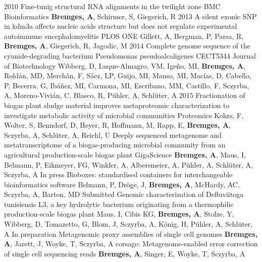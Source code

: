 \documentclass[print]{friggeri-cv}
\begin{document}
\begin{entrylist}
\entry
{2010}
{Fine-tunig structural RNA alignments in the twilight zone}
{BMC Bioinformatics}
{\textbf{Bremges, A}, Schirmer, S, Giegerich, R}
\entry
{2013}
{A silent exonic SNP in kdm3a affects nucleic acids structure but does not regulate experimental autoimmune encephalomyelitis}
{PLOS ONE}
{Gillett, A, Bergman, P, Parsa, R, \textbf{Bremges, A}, Giegerich, R, Jagodic, M}
\entry
{2014}
{Complete genome sequence of the cyanide-degrading bacterium Pseudomonas pseudoalcaligenes CECT5344}
{Journal of Biotechnology}
{Wibberg, D, Luque-Almagro, VM, Igeño, MI, \textbf{Bremges, A}, Roldán, MD, Merchán, F, Sáez, LP, Guijo, MI, Manso, MI, Macías, D, Cabello, P, Becerra, G, Ibáñez, MI, Carmona, MI, Escribano, MM, Castillo, F, Sczyrba, A, Moreno-Vivián, C, Blasco, R, Pühler, A, Schlüter, A}
\entry
{2015}
{Fractionation of biogas plant sludge material improves metaproteomic characterization to investigate metabolic activity of microbial communities}
{Proteomics}
{Kohrs, F, Wolter, S, Benndorf, D, Heyer, R, Hoffmann, M, Rapp, E, \textbf{Bremges, A}, Sczyrba, A, Schlüter, A, Reichl, U}
\entry
{}
{Deeply sequenced metagenome and metatranscriptome of a biogas-producing microbial community from an agricultural production-scale biogas plant}
{GigaScience}
{\textbf{Bremges, A}, Maus, I, Belmann, P, Eikmeyer, FG, Winkler, A, Albersmeier, A, Pühler, A, Schlüter, A, Sczyrba, A}
\entry
{In press}
{Bioboxes: standardised containers for interchangeable bioinformatics software}
{}
{Belmann, P, Dröge, J, \textbf{Bremges, A}, McHardy, AC, Sczyrba, A, Barton, MD}
\entry
{Submitted}
{Genomic characterization of Defluviitoga tunisiensis L3, a key hydrolytic bacterium originating from a thermophilic production-scale biogas plant}
{}
{Maus, I, Cibis KG, \textbf{Bremges, A}, Stolze, Y, Wibberg, D, Tomazetto, G, Blom, J, Sczyrba, A, König, H, Pühler, A, Schlüter, A}
\entry
{In preparation}
{Metagenomic proxy assemblies of single cell genomes}
{}
{\textbf{Bremges, A}, Jarett, J, Woyke, T, Sczyrba, A}
\entry
{}
{corsage: Metagenome-enabled error correction of single cell sequencing reads}
{}
{\textbf{Bremges, A}, Singer, E, Woyke, T, Sczyrba, A}

\end{entrylist}
\end{document}
